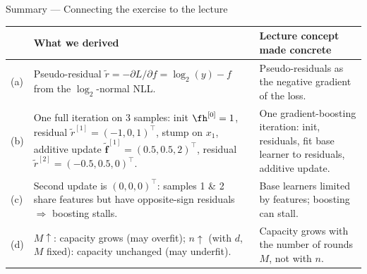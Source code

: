 \documentclass[aspectratio=169]{beamer}
\newcommand{\rtilde}[1]{\tilde{r}^{[#1]}}
\newcommand{\fhv}[1]{\tilde{\bm{f}}^{[#1]}}
\begin{document}
\begin{frame}{Summary --- Connecting the exercise to the lecture}
	\footnotesize
	\begin{center}
	\renewcommand{\arraystretch}{1.1}
	\begin{tabular}{@{}p{}p{}p{}@{}}
		\toprule
		& \textbf{What we derived} & \textbf{Lecture concept made concrete} \\
		\midrule
		(a) &
			Pseudo-residual $\tilde r = -\partial L / \partial f = \log_2(y) - f$ from the $\log_2$-normal NLL. &
			Pseudo-residuals as the negative gradient of the loss. \\
		(b) &
			One full iteration on 3 samples: init $\fh^{[0]} = 1$, residual $\rtilde{1} = (-1,0,1)^\top$, stump on $x_1$, additive update $\fhv{1} = (0.5, 0.5, 2)^\top$, residual $\rtilde{2} = (-0.5, 0.5, 0)^\top$. &
			One gradient-boosting iteration: init, residuals, fit base learner to residuals, additive update. \\
		(c) &
			Second update is $(0,0,0)^\top$: samples 1 \& 2 share features but have opposite-sign residuals $\Rightarrow$ boosting stalls. &
			Base learners limited by features; boosting can stall. \\
		(d) &
			$M\uparrow$: capacity grows (may overfit); $n\uparrow$ (with $d$, $M$ fixed): capacity unchanged (may underfit). &
			Capacity grows with the number of rounds $M$, not with $n$. \\
		\bottomrule
	\end{tabular}
	\end{center}
\end{frame}
\end{document}
